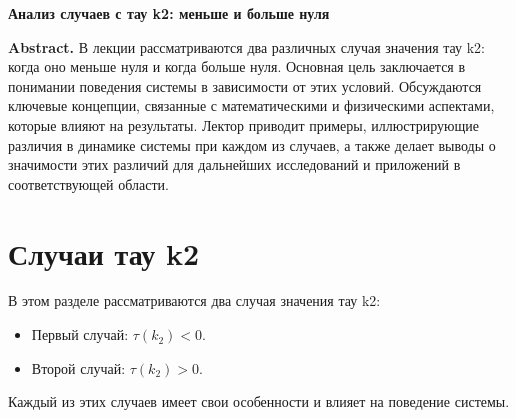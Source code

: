 \documentclass[a4paper]{article}
\begin{document}
\begin{center}
{\LARGE \textbf{Анализ случаев с тау k2: меньше и больше нуля}}\\[1em]
\end{center}

\textbf{Abstract.} В лекции рассматриваются два различных случая значения тау k2: когда оно меньше нуля и когда больше нуля. Основная цель заключается в понимании поведения системы в зависимости от этих условий. Обсуждаются ключевые концепции, связанные с математическими и физическими аспектами, которые влияют на результаты. Лектор приводит примеры, иллюстрирующие различия в динамике системы при каждом из случаев, а также делает выводы о значимости этих различий для дальнейших исследований и приложений в соответствующей области.

\section{Случаи тау k2}

В этом разделе рассматриваются два случая значения тау k2: 

\begin{itemize}
    \item Первый случай: $\tau(k_2) < 0$.
    \item Второй случай: $\tau(k_2) > 0$.
\end{itemize}

Каждый из этих случаев имеет свои особенности и влияет на поведение системы.
\end{document}

